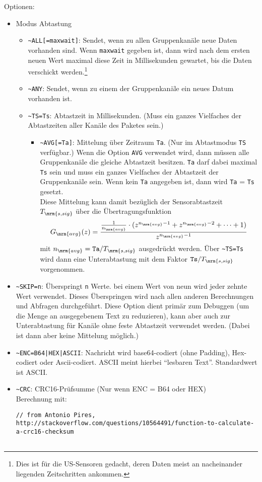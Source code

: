 Optionen:
\begin{itemize}
	\item Modus Abtastung
		\begin{itemize}
			\item \verb+~ALL[=maxwait]+: Sendet, wenn zu allen Gruppenkanäle neue Daten vorhanden sind. Wenn \verb+maxwait+ gegeben ist, dann wird nach dem ersten neuen Wert maximal diese Zeit in Millisekunden gewartet, bis die Daten verschickt werden.\footnote{Dies ist \zB für die US-Sensoren gedacht, deren Daten meist an nacheinander liegenden Zeitschritten ankommen.}
			\item \verb+~ANY+: Sendet, wenn zu einem der Gruppenkanäle ein neues Datum vorhanden ist.
			\item \verb+~TS=Ts+: Abtastzeit in Millisekunden. (Muss ein ganzes Vielfaches der Abtastzeiten aller Kanäle des Paketes sein.)
			\begin{itemize}
				\item \verb+~AVG[=Ta]+: Mittelung über Zeitraum \verb|Ta|. (Nur im Abtastmodus \verb|TS| verfügbar.) Wenn die Option \verb|AVG| verwendet wird, dann müssen alle Gruppenkanäle die gleiche Abtastzeit besitzen. \verb|Ta| darf dabei maximal \verb|Ts| sein und muss ein ganzes Vielfaches der Abtastzeit der Gruppenkanäle sein. Wenn kein \verb|Ta| angegeben ist, dann wird \verb|Ta| = \verb|Ts| gesetzt.\\
				Diese Mittelung kann damit bezüglich der Sensorabtastzeit $T_\mrm{s,sig}$ über die Übertragungsfunktion
				\begin{align*}
					G_\mrm{avg}(z) = \frac{\frac{1}{n_\mrm{avg}} \cdot ( z^{n_\mrm{avg}-1} + z^{n_\mrm{avg}-2} + \cdots + 1)}{z^{n_\mrm{avg}-1}}
				\end{align*}
				mit $n_\mrm{avg} = \mathtt{Ta}/T_\mrm{s,sig}$ ausgedrückt werden. Über \verb+~TS=Ts+ wird dann eine Unterabtastung mit dem Faktor $\mathtt{Ts}/T_\mrm{s,sig}$ vorgenommen.
			\end{itemize}
			
				
		\end{itemize}
	\item \verb+~SKIP=n+: Überspringt \texttt{n} Werte. \Dah bei einem Wert von neun wird jeder zehnte Wert verwendet. Dieses Überspringen wird nach allen anderen Berechnungen und Abfragen durchgeführt. Diese Option dient primär zum Debuggen (um die Menge an ausgegebenem Text zu reduzieren), kann aber auch zur Unterabtastung für Kanäle ohne feste Abtastzeit verwendet werden. (Dabei ist dann aber keine Mittelung möglich.)
	\item \verb+~ENC=B64|HEX|ASCII+: Nachricht wird base64-codiert (ohne Padding), Hex-codiert oder Ascii-codiert. ASCII meint hierbei "`lesbaren Text"'. Standardwert ist ASCII.
	\item \verb+~CRC+: CRC16-Prüfsumme (Nur wenn ENC = B64 oder HEX)\\
		Berechnung mit:
		\begin{lstlisting}[style=C_colored_smallfont]
// from Antonio Pires, http://stackoverflow.com/questions/10564491/function-to-calculate-a-crc16-checksum


\end{lstlisting}
\end{itemize}
